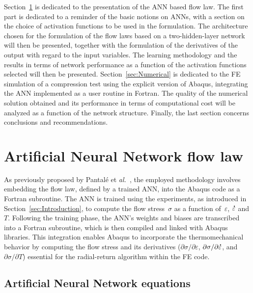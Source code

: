 \documentclass[algorithms,article,submit,pdftex,oneauthors]{Definitions/mdpi}
\makeatletter
\DeclareRobustCommand{\mdot}[1]{\accentset{\mbox{\bfseries .}}{#1}}
\DeclareRobustCommand{\eal}{et \emph{al.}\@\xspace}
\makeatother
\begin{document}
Section~\ref{sec:ANN} is dedicated to the presentation of the ANN based flow law.
The first part is dedicated to a reminder of the basic notions on ANNs, with a section on the choice of activation functions to be used in the formulation.
The architecture chosen for the formulation of the flow laws based on a two-hidden-layer network will then be presented, together with the formulation of the derivatives of the output with regard to the input variables.
The learning methodology and the results in terms of network performance as a function of the activation functions selected will then be presented.
Section~\ref{sec:Numerical} is dedicated to the FE simulation of a compression test using the explicit version of Abaqus, integrating the ANN implemented as a user routine in Fortran.
The quality of the numerical solution obtained and its performance in terms of computational cost will be analyzed as a function of the network structure.
Finally, the last section concerns conclusions and recommendations.

\section{Artificial Neural Network flow law}\label{sec:ANN}

As previously proposed by Pantalé \eal~\cite{Pantale-2021-EIN, Pantale-2023-DIA}, the employed methodology involves embedding the flow law, defined by a trained ANN, into the Abaqus code as a Fortran subroutine.
The ANN is trained using the experiments, as introduced in Section~\ref{sec:Introduction}, to compute the flow stress~$\sigma$ as a function of~$\varepsilon$, $\mdot{\varepsilon}$ and $T$.
Following the training phase, the ANN's weights and biases are transcribed into a Fortran subroutine, which is then compiled and linked with Abaqus libraries.
This integration enables Abaqus to incorporate the thermomechanical behavior by computing the flow stress and its derivatives ($\partial\sigma/\partial\varepsilon$, $\partial\sigma/\partial\mdot{\varepsilon}$, and $\partial\sigma/\partial T$) essential for the radial-return algorithm within the FE code.

\subsection{Artificial Neural Network equations}\label{subsec:ANN-eqn}
\end{document}
